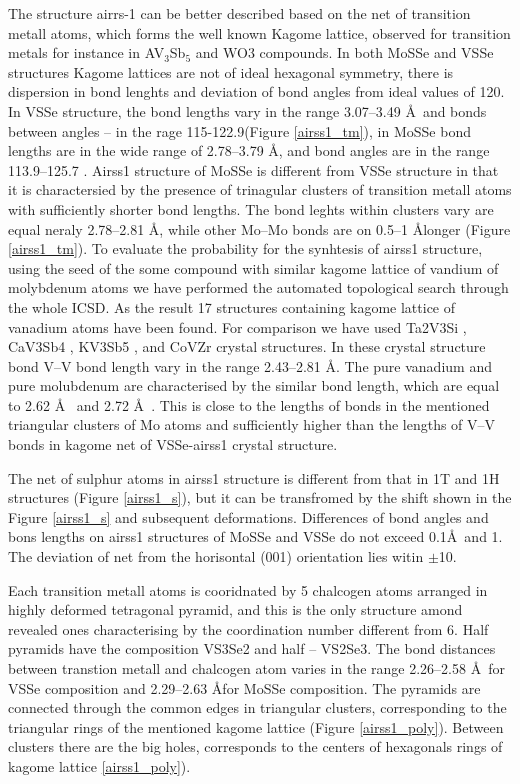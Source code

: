 \documentclass[a4paperm]{article}
\begin{document}
The structure airrs-1 can be better described based on the net of transition metall atoms, which forms the well known Kagome lattice\cite{zhang2021_kagome}, observed for transition metals for instance in AV$_3$Sb$_5$ \cite{ortiz2021} and WO3 \cite{gerand1979} compounds.
In both MoSSe and VSSe structures Kagome lattices are not of ideal hexagonal symmetry, there is dispersion in bond lenghts and deviation of bond angles from ideal values of 120\textdegree.
In VSSe  structure, the bond lengths vary in the range 3.07--3.49 \AA\ and bonds between angles – in the rage 115-122.9\textdegree (Figure \ref{airss1_tm}),  in MoSSe bond lengths are in the wide range of 2.78--3.79 \AA, and bond angles are in the range 113.9--125.7 \textdegree.
Airss1 structure of MoSSe is different from VSSe structure in that it is charactersied by the presence of trinagular clusters of transition metall atoms with sufficiently shorter bond lengths.
The bond leghts within clusters vary are equal neraly 2.78--2.81 \AA, while other Mo--Mo bonds are on 0.5--1 \AA longer (Figure \ref{airss1_tm}).
To evaluate the probability for the synhtesis of airss1 structure, using the seed of the some compound with similar kagome lattice of vandium of molybdenum atoms we have performed the automated topological search through the whole ICSD.
As the result 17 structures containing kagome lattice of vanadium atoms have been found.
For comparison we have used Ta2V3Si \cite{Ta2V3Si}, CaV3Sb4 \cite{ CaV3Sb4}, KV3Sb5 \cite{KV3Sb5}, and CoVZr \cite{ZrVCO} crystal structures.
In these crystal structure bond V--V bond length vary in the range 2.43--2.81 \AA.
The pure vanadium and pure molubdenum are characterised by the similar bond length, which are equal to 2.62 \AA\ \cite{vanadium} and 2.72 \AA\ \cite{molybdenum}.
This is close to the lengths of bonds in the mentioned triangular clusters of Mo atoms and sufficiently higher than the lengths of V--V bonds in kagome net of VSSe-airss1 crystal structure.


The net of sulphur atoms in airss1 structure is different from that in 1T and 1H structures (Figure \ref{airss1_s}), but it can be transfromed by the shift shown in the Figure \ref{airss1_s} and subsequent deformations.
Differences of bond angles and bons lengths on airss1 structures of MoSSe and VSSe do not exceed 0.1\AA\ and 1\textdegree.
The deviation of net from the horisontal (001) orientation lies witin $\pm$10\textdegree.

Each transition metall atoms is cooridnated by 5 chalcogen atoms arranged in highly deformed tetragonal pyramid, and this is the only structure amond revealed ones characterising by the coordination number different from 6.
Half pyramids have the composition VS3Se2 and half -- VS2Se3.
The bond distances between transtion metall and chalcogen atom varies in the range 2.26--2.58 \AA\ for VSSe composition and 2.29--2.63 \AA for MoSSe composition.
The pyramids are connected through the common edges in triangular clusters, corresponding to the triangular rings of the mentioned kagome lattice (Figure \ref{airss1_poly}).
Between clusters there are the big holes, corresponds to the centers of hexagonals rings of kagome lattice \ref{airss1_poly}).
\end{document}
